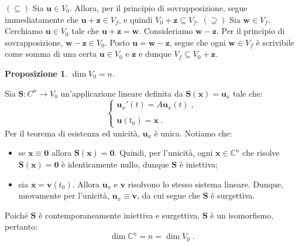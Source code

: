 \documentclass[a4paper,12pt]{report}
\theoremstyle{plain}
\newtheorem{prop}{Proposizione}[section]
\theoremstyle{definition}
\theoremstyle{remark}
\numberwithin{equation}{section}
\begin{document}
\proof $(\subseteq)$ Sia $\mathbf{u} \in V_0$. Allora, per il principio di sovrapposizione, segue immediatamente che $\mathbf{u}+\mathbf{z} \in V_f$, e quindi $V_0+\mathbf{z} \subseteq V_f$.
\endproof
\proof $(\supseteq)$ Sia $\mathbf{w} \in V_f$. Cerchiamo $\mathbf{u} \in V_0$ tale che $\mathbf{u}+\mathbf{z}=\mathbf{w}$. Consideriamo $\mathbf{w}-\mathbf{z}$. Per il principio di sovrapposizione, $\mathbf{w}-\mathbf{z} \in V_0$. Posto $\mathbf{u}=\mathbf{w}-\mathbf{z}$, segue che ogni $\mathbf{w}\in V_f$ è scrivibile come somma di una certa $\mathbf{u} \in V_0$ e $\mathbf{z}$ e dunque $V_f \subseteq V_0+\mathbf{z}$.
\endproof
\begin{prop} $\dim{V_0}=n$.
\end{prop}
\proof Sia $\mathbf{S}:C^n \to V_0$ un'applicazione lineare definita da $\mathbf{S}(\mathbf{x})=\mathbf{u}_x$ tale che:
\begin{equation}
\begin{cases}
 \mathbf{u}_x'(t)=A\mathbf{u}_x(t)\;, \\
 \\
 \mathbf{u}(t_0)=\mathbf{x}\;.
\end{cases}
\end{equation}
Per il teorema di esistenza ed unicità, $\mathbf{u}_x$ è unica. Notiamo che:
\begin{itemize}
 \item se $\mathbf{x}\equiv \mathbf{0}$ allora $\mathbf{S}(\mathbf{x})=\mathbf{0}$. Quindi, per l'unicità, ogni $\mathbf{x} \in \mathbb{C
}^n$ che risolve $\mathbf{S}(\mathbf{x})=\mathbf{0}$ è identicamente nullo, dunque $\mathbf{S}$ è iniettiva;
 \item sia $\mathbf{x}=\mathbf{v}(t_0)$. Allora $\mathbf{u}_x$ e $\mathbf{v}$ risolvono lo stesso sistema lineare. Dunque, nuovamente per l'unicità, $\mathbf{u}_x \equiv \mathbf{v}$, da cui segue che $\mathbf{S}$ è surgettiva.
\end{itemize}
Poiché $\mathbf{S}$ è contemporaneamente iniettiva e surgettiva, $\mathbf{S}$ è un isomorfismo, pertanto:
\begin{equation}
\dim{\mathbb{C}^n}=n=\dim{V_0}\;.
\end{equation}
\endproof
\end{document}

